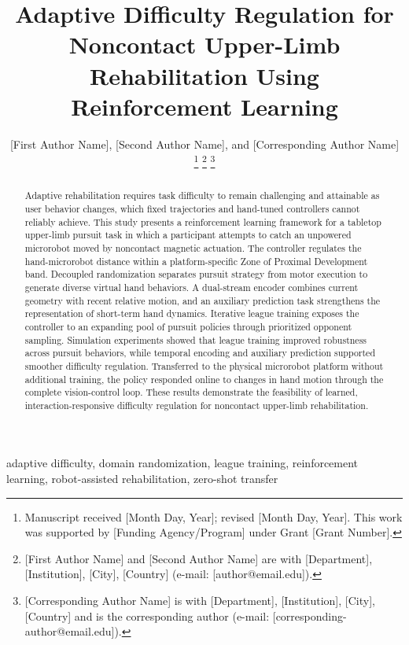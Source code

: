 \documentclass[journal,twoside,web]{ieeecolor2}
\begin{document}
\title{Adaptive Difficulty Regulation for Noncontact Upper-Limb Rehabilitation Using Reinforcement Learning}
\author{[First Author Name], [Second Author Name], and [Corresponding Author Name]
\thanks{Manuscript received [Month Day, Year]; revised [Month Day, Year]. This work was supported by [Funding Agency/Program] under Grant [Grant Number].}
\thanks{[First Author Name] and [Second Author Name] are with [Department], [Institution], [City], [Country] (e-mail: [author@email.edu]).}
\thanks{[Corresponding Author Name] is with [Department], [Institution], [City], [Country] and is the corresponding author (e-mail: [corresponding-author@email.edu]).}}
\maketitle

\begin{abstract}
Adaptive rehabilitation requires task difficulty to remain challenging and attainable as user behavior changes, which fixed trajectories and hand-tuned controllers cannot reliably achieve. This study presents a reinforcement learning framework for a tabletop upper-limb pursuit task in which a participant attempts to catch an unpowered microrobot moved by noncontact magnetic actuation. The controller regulates the hand-microrobot distance within a platform-specific Zone of Proximal Development band. Decoupled randomization separates pursuit strategy from motor execution to generate diverse virtual hand behaviors. A dual-stream encoder combines current geometry with recent relative motion, and an auxiliary prediction task strengthens the representation of short-term hand dynamics. Iterative league training exposes the controller to an expanding pool of pursuit policies through prioritized opponent sampling. Simulation experiments showed that league training improved robustness across pursuit behaviors, while temporal encoding and auxiliary prediction supported smoother difficulty regulation. Transferred to the physical microrobot platform without additional training, the policy responded online to changes in hand motion through the complete vision-control loop. These results demonstrate the feasibility of learned, interaction-responsive difficulty regulation for noncontact upper-limb rehabilitation.
\end{abstract}

\begin{IEEEkeywords}
adaptive difficulty, domain randomization, league training, reinforcement learning, robot-assisted rehabilitation, zero-shot transfer
\end{IEEEkeywords}
\end{document}
